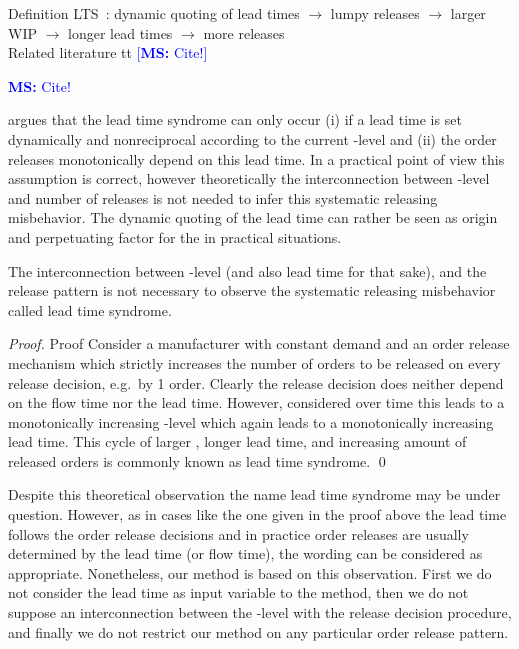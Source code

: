 \documentclass[mnsc]{informs3}
\newcommand\MS[2][r]{\ifx t#1 \textcolor{blue}{[\textbf{MS:} #2]}
  \else \begin{center}\textcolor{blue}{\textbf{MS:} #2} \end{center} \fi}
\begin{document}
Definition LTS~\citep{selccuk2013adaptive}: dynamic quoting of lead times $\rightarrow$ lumpy releases $\rightarrow$ larger
WIP $\rightarrow$ longer lead times $\rightarrow$ more releases\\


Related literature \MS[t]{Cite!} argues that the lead time syndrome can only occur (i) if a lead
time is set dynamically and nonreciprocal according to the current \WIP{}-level and (ii) the order
releases monotonically depend on this lead time. In a practical point of view this assumption is
correct, however theoretically the interconnection between \WIP{}-level and number of releases is
not needed to infer this systematic releasing misbehavior. The dynamic quoting of the lead time can
rather be seen as origin and perpetuating factor for the \LTS{} in practical situations.

\begin{lemma}
  The interconnection between \WIP{}-level (and also lead time for that sake), and the release
  pattern is not necessary to observe the systematic releasing misbehavior called lead time
  syndrome.
\end{lemma}

\begin{proof}{Proof}
  Consider a manufacturer with constant demand and an order release mechanism which strictly
  increases the number of orders to be released on every release decision, e.g.~by 1 order. Clearly
  the release decision does neither depend on the flow time nor the lead time. However, considered
  over time this leads to a monotonically increasing \WIP{}-level which again leads to a
  monotonically increasing lead time. This cycle of larger \WIP{}, longer lead time, and increasing
  amount of released orders is commonly known as lead time syndrome. \qed
\end{proof}

Despite this theoretical observation the name lead time syndrome may be under question. However, as
in cases like the one given in the proof above the lead time follows the order release decisions and
in practice order releases are usually determined by the lead time (or flow time), the wording can
be considered as appropriate.
%
Nonetheless, our method is based on this observation. First we do not consider the lead time as
input variable to the method, then we do not suppose an interconnection between the \WIP{}-level
with the release decision procedure, and finally we do not restrict our method on any particular
order release pattern.
\end{document}
